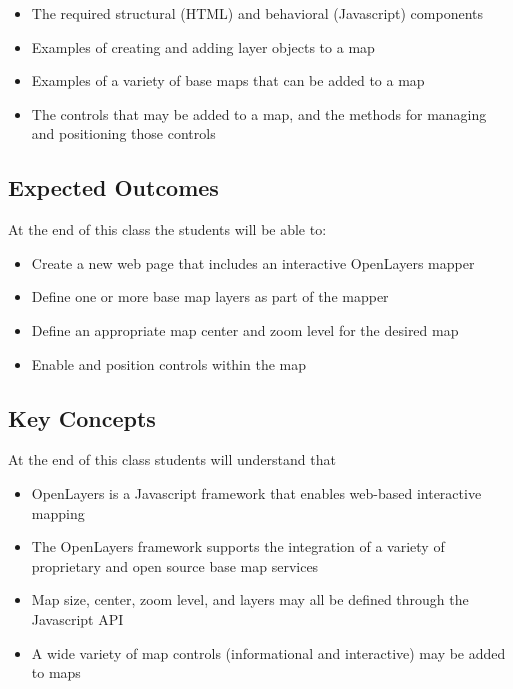 \documentclass[]{book}
\providecommand{\tightlist}{%
  \setlength{\itemsep}{0pt}\setlength{\parskip}{0pt}}
\begin{document}
\begin{itemize}
\tightlist
\item
  The required structural (HTML) and behavioral (Javascript) components
\item
  Examples of creating and adding layer objects to a map
\item
  Examples of a variety of base maps that can be added to a map
\item
  The controls that may be added to a map, and the methods for managing
  and positioning those controls
\end{itemize}

\subsection{Expected Outcomes}\label{expected-outcomes}

At the end of this class the students will be able to:

\begin{itemize}
\tightlist
\item
  Create a new web page that includes an interactive OpenLayers mapper
\item
  Define one or more base map layers as part of the mapper
\item
  Define an appropriate map center and zoom level for the desired map
\item
  Enable and position controls within the map
\end{itemize}

\subsection{Key Concepts}\label{key-concepts}

At the end of this class students will understand that

\begin{itemize}
\tightlist
\item
  OpenLayers is a Javascript framework that enables web-based
  interactive mapping
\item
  The OpenLayers framework supports the integration of a variety of
  proprietary and open source base map services
\item
  Map size, center, zoom level, and layers may all be defined through
  the Javascript API
\item
  A wide variety of map controls (informational and interactive) may be
  added to maps
\end{itemize}
\end{document}
